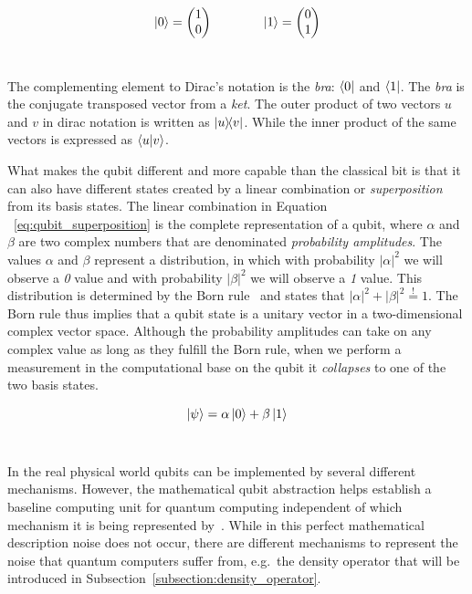 \begin{equation}\label{eq:qubit_bases}
    \ket{0} = \begin{pmatrix}
                1 \\ 0
              \end{pmatrix} \qquad \qquad
    \ket{1} = \begin{pmatrix}
                0 \\ 1
              \end{pmatrix}
\end{equation} \

The complementing element to Dirac's notation is the \textit{bra}:
\(\bra{0}\) and \(\bra{1}\). The \textit{bra} is the conjugate transposed
vector from a \textit{ket}. The outer product of two vectors \(u\) and
\(v\) in dirac notation is written as \(\ketbra{u}{v}\). While the inner
product of the same vectors is expressed as \(\braket{u}{v}\). \

What makes the qubit different and more capable than
the classical bit is that it can also have different states
created by a linear combination or \textit{superposition} from
its basis states. The linear combination in Equation
~\ref{eq:qubit_superposition} is the complete representation
of a qubit, where \(\alpha\) and \(\beta\) are two complex numbers that
are denominated \textit{probability amplitudes}.
The values \(\alpha\) and \(\beta\) represent a distribution, in which
with probability \(|\alpha|^2\) we will observe a \textit{0}
value and with probability \(|\beta|^2\) we will observe a
\textit{1} value. This distribution is determined by the
Born rule~\cite{born_quantenmechanik_1926} and states that \(|\alpha|^2 + |\beta|^2 \stackrel{!}{=} 1\).
The Born rule thus implies that a qubit state is a unitary vector in
a two-dimensional complex vector space. Although the
probability amplitudes can take on any complex value as long
as they fulfill the Born rule, when we perform a measurement
in the computational base on the qubit it \textit{collapses}
to one of the two basis states. \

\begin{equation}\label{eq:qubit_superposition}
  \ket{\psi} = \alpha\ket{0} + \beta\ket{1}
\end{equation} \

In the real physical world qubits can be implemented by
several different mechanisms. However, the mathematical
qubit abstraction helps establish a baseline computing unit
for quantum computing independent of which mechanism it is
being represented by~\cite{nielsen_quantum_2010}. While in this perfect
mathematical description noise does not occur, there are
different mechanisms to represent the noise that quantum
computers suffer from, e.g.\ the density operator that will
be introduced in Subsection~\ref{subsection:density_operator}. \

